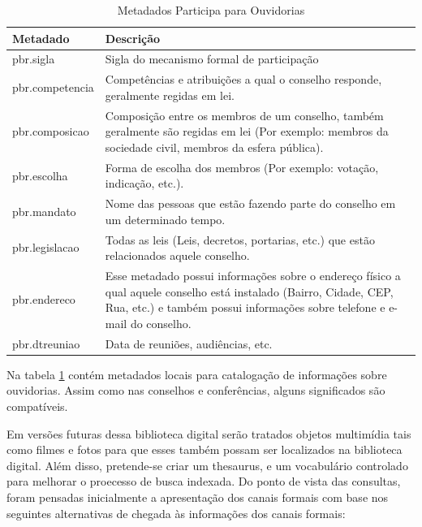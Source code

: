 \begin{table}[H]
\begin{center}
    \begin{tabular}{ | l | p{10cm} |}
    \hline
    \textbf{Metadado} & \textbf{Descrição} \\ \hline
    pbr.sigla & Sigla do mecanismo formal de participação \\ \hline
    pbr.competencia & Competências e atribuições a qual o conselho responde, geralmente regidas em lei. \\ \hline
    pbr.composicao & Composição entre os membros de um conselho, também geralmente são regidas em lei (Por exemplo: membros da sociedade civil, membros da esfera pública). \\ \hline
    pbr.escolha & Forma de escolha dos membros (Por exemplo: votação, indicação, etc.). \\ \hline
    pbr.mandato & Nome das pessoas que estão fazendo parte do conselho em um determinado tempo. \\ \hline
    pbr.legislacao & Todas as leis (Leis, decretos, portarias, etc.) que estão relacionados aquele conselho. \\ \hline
    pbr.endereco & Esse metadado possui informações sobre o endereço físico a qual aquele conselho está instalado (Bairro, Cidade, CEP, Rua, etc.) e também possui informações sobre telefone e e-mail do conselho. \\ \hline
    pbr.dtreuniao & Data de reuniões, audiências, etc. \\ \hline
    \end{tabular}
    \caption{Metadados Participa para Ouvidorias}
    \label{tab:metadata_pbr_ouvidorias}
\end{center}
\end{table}


Na tabela \ref{tab:metadata_pbr_ouvidorias} contém metadados locais para catalogação de informações sobre ouvidorias. Assim como nas conselhos e conferências, alguns significados são compatíveis.


Em versões futuras dessa biblioteca digital serão tratados objetos multimídia tais como filmes e fotos para que esses também possam ser localizados na biblioteca digital. Além disso, pretende-se criar um thesaurus, e um vocabulário controlado para melhorar o proecesso de busca indexada. Do ponto de vista das consultas, foram pensadas inicialmente a apresentação dos canais formais com base nos seguintes alternativas de chegada às informações dos canais formais:

